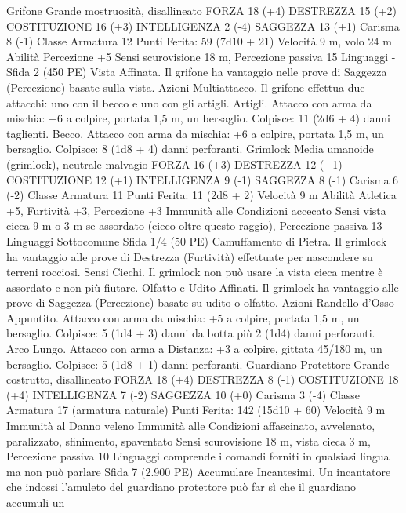 \begin{multicols}{2}
Grifone
Grande mostruosità, disallineato
FORZA 18 (+4)
DESTREZZA 15 (+2)
COSTITUZIONE 16 (+3)
INTELLIGENZA 2 (-4)
SAGGEZZA 13 (+1)
Carisma 8 (-1)
Classe Armatura 12
\hspace*{0pt}\hfill{Punti Ferita}: 59 (7d10 + 21)
Velocità 9 m, volo 24 m
Abilità Percezione +5
Sensi scurovisione 18 m, Percezione passiva 15
Linguaggi -
Sfida 2 (450 PE)
Vista Affinata. Il grifone ha vantaggio nelle prove di Saggezza
(Percezione) basate sulla vista.
Azioni
Multiattacco. Il grifone effettua due attacchi: uno con il becco e
uno con gli artigli.
Artigli. Attacco con arma da mischia: +6 a colpire, portata 1,5
m, un bersaglio.
Colpisce: 11 (2d6 + 4) danni taglienti.
Becco. Attacco con arma da mischia: +6 a colpire, portata 1,5 m,
un bersaglio.
Colpisce: 8 (1d8 + 4) danni perforanti.
Grimlock
Media umanoide (grimlock), neutrale malvagio
FORZA 16 (+3)
DESTREZZA 12 (+1)
COSTITUZIONE 12 (+1)
INTELLIGENZA 9 (-1)
SAGGEZZA 8 (-1)
Carisma 6 (-2)
Classe Armatura 11
\hspace*{0pt}\hfill{Punti Ferita}: 11 (2d8 + 2)
Velocità 9 m
Abilità Atletica +5, Furtività +3, Percezione +3
Immunità alle Condizioni accecato
Sensi vista cieca 9 m o 3 m se assordato (cieco oltre questo
raggio), Percezione passiva 13
Linguaggi Sottocomune
Sfida 1/4 (50 PE)
Camuffamento di Pietra. Il grimlock ha vantaggio alle prove di
Destrezza (Furtività) effettuate per nascondere su terreni
rocciosi.
Sensi Ciechi. Il grimlock non può usare la vista cieca mentre è
assordato e non più fiutare.
Olfatto e Udito Affinati. Il grimlock ha vantaggio alle prove di
Saggezza (Percezione) basate su udito o olfatto.
Azioni
Randello d’Osso Appuntito. Attacco con arma da mischia: +5 a
colpire, portata 1,5 m, un bersaglio.
Colpisce: 5 (1d4 + 3) danni da botta più 2 (1d4) danni
perforanti.
Arco Lungo. Attacco con arma a Distanza: +3 a colpire, gittata
45/180 m, un bersaglio.
Colpisce: 5 (1d8 + 1) danni perforanti.
Guardiano Protettore
Grande costrutto, disallineato
FORZA 18 (+4)
DESTREZZA 8 (-1)
COSTITUZIONE 18 (+4)
INTELLIGENZA 7 (-2)
SAGGEZZA 10 (+0)
Carisma 3 (-4)
Classe Armatura 17 (armatura naturale)
\hspace*{0pt}\hfill{Punti Ferita}: 142 (15d10 + 60)
Velocità 9 m
Immunità al Danno veleno
Immunità alle Condizioni affascinato, avvelenato, paralizzato,
sfinimento, spaventato
Sensi scurovisione 18 m, vista cieca 3 m, Percezione passiva 10
Linguaggi comprende i comandi forniti in qualsiasi lingua ma
non può parlare
Sfida 7 (2.900 PE)
Accumulare Incantesimi. Un incantatore che indossi l’amuleto del
guardiano protettore può far sì che il guardiano accumuli un

\end{multicols}
